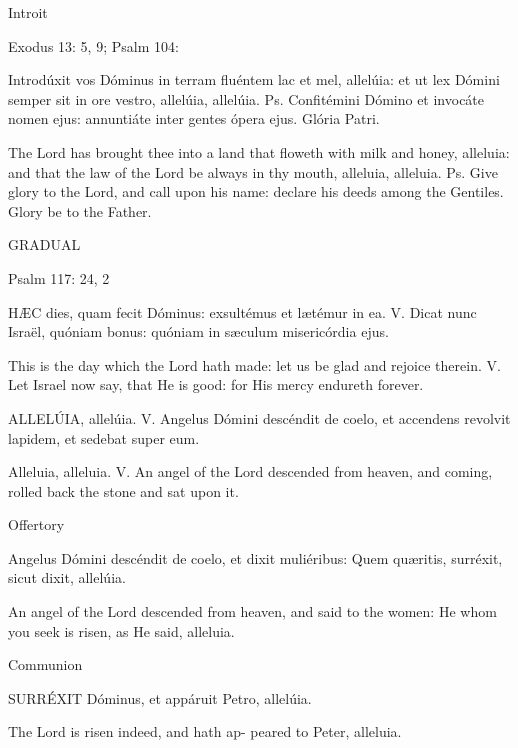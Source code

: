 
Introit

Exodus 13: 5, 9; Psalm 104: 

Introdúxit vos Dóminus in terram fluéntem lac et mel, allelúia: 
et ut lex Dómini semper sit in ore vestro, allelúia, allelúia. 
Ps. Confitémini Dómino et invocáte nomen ejus: annuntiáte inter gentes ópera ejus. 
Glória Patri. 

The Lord has brought thee into a land that 
floweth with milk and honey, alleluia: and 
that the law of the Lord be always in thy 
mouth, alleluia, alleluia. Ps. Give glory to 
the Lord, and call upon his name: declare 
his deeds among the Gentiles. Glory be to 
the Father. 



GRADUAL 

Psalm 117: 24, 2 

HÆC dies, quam fecit Dóminus: 
exsultémus et lætémur in ea. 
V. Dicat nunc Israël, quóniam bonus: quóniam in sæculum misericórdia ejus. 

This is the day which the Lord hath made: 
let us be glad and rejoice therein. V. Let 
Israel now say, that He is good: for His 
mercy endureth forever. 

ALLELÚIA, allelúia. 
V. Angelus Dómini descéndit de coelo, et accendens revolvit lapidem, et sedebat super eum.
 
Alleluia, alleluia. V. An angel of the Lord 
descended from heaven, and coming, 
rolled back the stone and sat upon it. 


Offertory

Angelus Dómini descéndit de coelo, et dixit muliéribus: 
Quem quæritis, surréxit, sicut dixit, allelúia. 

An angel of the Lord descended from 
heaven, and said to the women: He whom 
you seek is risen, as He said, alleluia.


Communion

SURRÉXIT Dóminus, et appáruit Petro, allelúia. 

The Lord is risen indeed, and hath ap-
peared to Peter, alleluia. 
